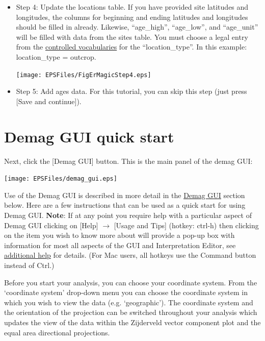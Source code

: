 \documentclass[11pt]{book}
\begin{document}
{{\begin{itemize}
\texttt{[image: EPSFiles/FigErMagicStep3.eps]}


\item Step 4: Update the locations table.  If you have provided site latitudes and longitudes, the columns for beginning and ending latitudes and longitudes should be filled in already. Likewise, ``age_high'', ``age_low'', and ``age_unit'' will be filled with data from the sites table.  You must choose a legal entry from the \href{http://earthref.org/MAGIC/shortlists.htm}{controlled vocabularies} for the  ``location\_type''. In this example: location\_type = outcrop.

\texttt{[image: EPSFiles/FigErMagicStep4.eps]}

\item Step 5: Add ages data.  For this tutorial, you can skip this step (just press [Save and continue]).

\end{itemize}


\section{Demag GUI quick start}
\label{sect:demag_gui}

Next, click the [Demag GUI] button.  This is the main panel of the demag GUI:

\texttt{[image: EPSFiles/demag\_gui.eps]}

Use of the Demag GUI is described in more detail in the \href{#demag_gui.py}{Demag GUI} section below. Here are a few instructions that can be used as a quick start for using Demag GUI. {\bf Note}: If at any point you require help with a particular aspect of Demag GUI clicking on [Help] $\rightarrow$ [Usage and Tips] (hotkey: ctrl-h) then clicking on the item you wish to know more about will provide a pop-up box with information for most all aspects of the GUI and Interpretation Editor, see \hyperref[add-help]{additional help} for details.  (For Mac users, all hotkeys use the Command button instead of Ctrl.)

Before you start your analysis, you can choose your coordinate system.  From the `coordinate system' drop-down menu you can choose the coordinate system in which you wish to view the data (e.g.  `geographic'). The coordinate system and the orientation of the projection can be switched throughout your analysis which updates the view of the data within the Zijderveld vector component plot and the equal area directional projections.

}}
\end{document}
